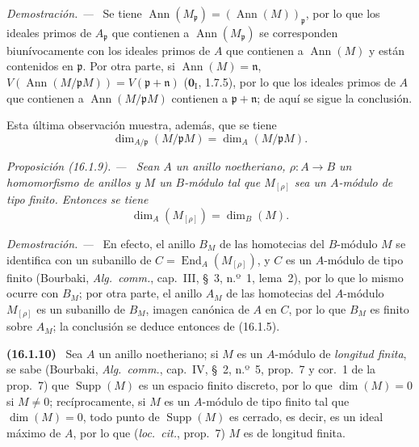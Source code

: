 \documentclass[10pt,oneside]{book}
\makeatletter
\newcommand{\setmanualcurrentlabel}[1]{\def\@currentlabel{#1}}
\newenvironment{env}[1][]{\setmanualcurrentlabel{#1}\par\medskip\noindent\textbf{(#1)}\ }{\par}
\newenvironment{proposition}[1][]{%
  \setmanualcurrentlabel{#1}\par\medskip\noindent\itshape Proposición (#1). ---\ }{\par}
\newenvironment{proof}{%
  \par\medskip\noindent\textit{Demostración. ---\ }}{\par}
\makeatother
\begin{document}
\begin{proof}
Se tiene
$\operatorname{Ann}(M_{\mathfrak{p}})=(\operatorname{Ann}(M))_{\mathfrak{p}}$,
por lo que los ideales primos de $A_{\mathfrak{p}}$ que contienen a
$\operatorname{Ann}(M_{\mathfrak{p}})$ se corresponden biunívocamente con los
ideales primos de $A$ que contienen a $\operatorname{Ann}(M)$ y están
contenidos en $\mathfrak{p}$. Por otra parte, si
$\operatorname{Ann}(M)=\mathfrak{n}$,
$V(\operatorname{Ann}(M/\mathfrak{p}M))=V(\mathfrak{p}+\mathfrak{n})$
($\mathbf{0}_{\mathrm I}$, 1.7.5), por lo que los ideales primos de $A$ que contienen a
$\operatorname{Ann}(M/\mathfrak{p}M)$ contienen a
$\mathfrak{p}+\mathfrak{n}$; de aquí se sigue la conclusión.

Esta última observación muestra, además, que se tiene
\[
\label{0.16.1.8.2-es}
  \dim_{A/\mathfrak{p}}(M/\mathfrak{p}M)=\dim_A(M/\mathfrak{p}M).
\tag{16.1.8.2}
\]
\end{proof}

\begin{proposition}[16.1.9]
\label{0.16.1.9-es}
Sean $A$ un anillo noetheriano, $\rho:A\to B$ un homomorfismo de anillos y $M$
un $B$-módulo tal que $M_{[\rho]}$ sea un $A$-módulo de tipo finito. Entonces
se tiene
\[
\label{0.16.1.9.1-es}
  \dim_A(M_{[\rho]})=\dim_B(M).
\tag{16.1.9.1}
\]
\end{proposition}

\begin{proof}
En efecto, el anillo $B_M$ de las homotecias del $B$-módulo $M$ se identifica
con un subanillo de $C=\operatorname{End}_A(M_{[\rho]})$, y $C$ es un
$A$-módulo de tipo finito (Bourbaki, \emph{Alg.~comm.}, cap.~III, \S~3,
n.º~1, lema~2), por lo que lo mismo ocurre con $B_M$; por otra parte, el
anillo $A_M$ de las homotecias del $A$-módulo $M_{[\rho]}$ es un subanillo de
$B_M$, imagen canónica de $A$ en $C$, por lo que $B_M$ es finito sobre $A_M$;
la conclusión se deduce entonces de (16.1.5).
\end{proof}

\begin{env}[16.1.10]
\label{0.16.1.10-es}
Sea $A$ un anillo noetheriano; si $M$ es un $A$-módulo de \emph{longitud finita}, se
sabe (Bourbaki, \emph{Alg.~comm.}, cap.~IV, \S~2, n.º~5, prop.~7 y cor.~1 de
la prop.~7) que $\operatorname{Supp}(M)$ es un espacio finito discreto, por lo
que $\dim(M)=0$ si $M\neq0$; recíprocamente, si $M$ es un $A$-módulo de tipo
finito tal que $\dim(M)=0$, todo punto de $\operatorname{Supp}(M)$ es cerrado,
es decir, es un ideal máximo de $A$, por lo que (\emph{loc.~cit.}, prop.~7)
$M$ es de longitud finita.
\end{env}
\end{document}
